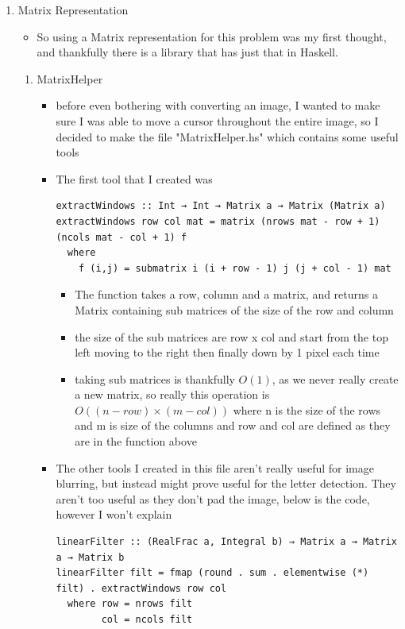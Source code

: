 \documentclass{article}
\begin{document}
\begin{enumerate}
\item Matrix Representation
\label{sec-2-1}
\begin{itemize}
\item So using a Matrix representation for this problem was my first
thought, and thankfully there is a library that has just that in Haskell.
\end{itemize}
\begin{enumerate}
\item MatrixHelper
\label{sec-2-1-1}
\begin{itemize}
\item before even bothering with converting an image, I wanted to make
sure I was able to move a cursor throughout the entire image, so Ι
decided to make the file "MatrixHelper.hs" which contains some
useful tools
\item The first tool that I created was
\begin{verbatim}
extractWindows :: Int → Int → Matrix a → Matrix (Matrix a)
extractWindows row col mat = matrix (nrows mat - row + 1) (ncols mat - col + 1) f
  where
    f (i,j) = submatrix i (i + row - 1) j (j + col - 1) mat
\end{verbatim}
\begin{itemize}
\item The function takes a row, column and a matrix, and returns a Matrix
containing sub matrices of the size of the row and column
\item the size of the sub matrices are row x col and start from the top
left moving to the right then finally down by 1 pixel each time
\item taking sub matrices is thankfully $O(1)$, as we never really create
a new matrix, so really this operation is $O((n-row) × (m-col))$
where n is the size of the rows and m is size of the columns and row and
col are defined as they are in the function above
\end{itemize}
\item The other tools Ι created in this file aren't really useful for
image blurring, but instead might prove useful for the letter
detection. They aren't too useful as they don't pad the image, below
is the code, however I won't explain
\begin{verbatim}
linearFilter :: (RealFrac a, Integral b) ⇒ Matrix a → Matrix a → Matrix b
linearFilter filt = fmap (round . sum . elementwise (*) filt) . extractWindows row col
  where row = nrows filt
        col = ncols filt


\end{verbatim}
\end{itemize}
\end{enumerate}
\end{enumerate}
\end{document}
